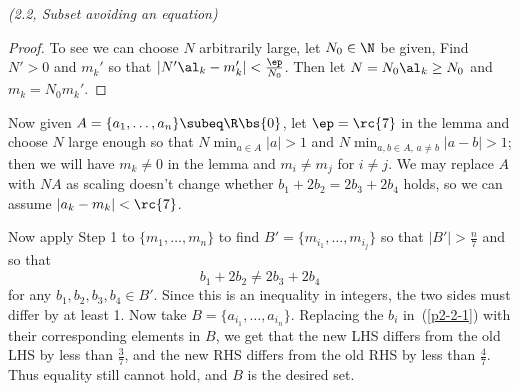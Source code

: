 \begin{problem}{\it (2.2, Subset avoiding an equation)}
\begin{proof}
To see we can choose $N$ arbitrarily large, let $N_0\in \N$ be given, Find $N'>0$ and $m_k'$ so that $|N'\al_k-m_k'|<\frac{\ep}{N_0}$. Then let $N=N_0\al_k\geq N_0$ and $m_k=N_0m_k'$.
\end{proof}
Now given $A=\{a_1,\ldots, a_n\}\subeq \R\bs \{0\}$, let $\ep=\rc{7}$ in the lemma and choose $N$ large enough so that $N\min_{a\in A}|a|>1$ and $N\min_{a,b\in A,\,a\neq b}|a-b|>1$; then we will have $m_k\neq 0$ in the lemma and $m_i\neq m_j$ for $i\neq j$. 
We may replace $A$ with $NA$ as scaling doesn't change whether $b_1+2b_2= 2b_3+2b_4$ holds, so we can assume $|a_k-m_k|<\rc{7}$.

Now apply Step 1 to $\{m_1,\ldots, m_n\}$ to find $B'=\{m_{i_1},\ldots, m_{i_j}\}$ so that $|B'|>\frac{n}{7}$ and so that
\begin{equation}\label{p2-2-1}
b_1+2b_2\neq 2b_3+2b_4
\end{equation}
for any $b_1,b_2,b_3,b_4\in B'$. Since this is an inequality in integers, the two sides must differ by at least 1.
Now take $B=\{a_{i_1},\ldots, a_{i_n}\}$. Replacing the $b_i$ in~(\ref{p2-2-1}) with their corresponding elements in $B$, we get that the new LHS differs from the old LHS by less than $\frac{3}{7}$, and the new RHS differs from the old RHS by less than $\frac{4}{7}$. Thus equality still cannot hold, and $B$ is the desired set.
\end{problem}
